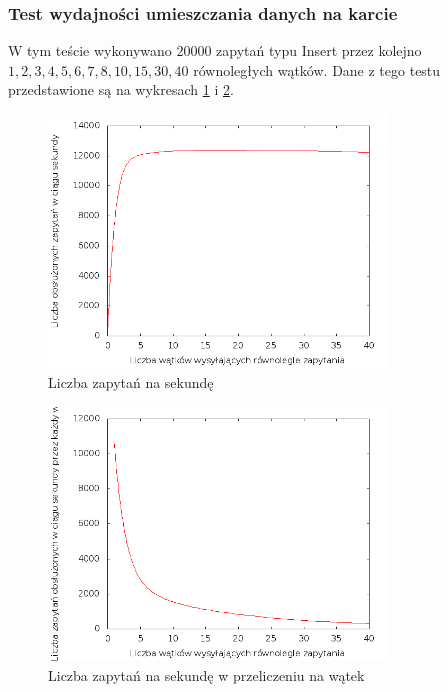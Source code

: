 \documentclass[paper=a4, fontsize=11pt]{scrartcl} %
\numberwithin{equation}{section} %
\numberwithin{figure}{section} %
\numberwithin{table}{section} %
\begin{document}
		\subsubsection{Test wydajności umieszczania danych na karcie}
		W tym teście wykonywano $20000$ zapytań typu Insert przez kolejno $1, 2, 3, 4, 5, 6, 7, 8, 10, 15, 30, 40$ równoległych wątków. Dane z tego testu przedstawione są na wykresach \ref{fig:concurrency} i \ref{fig:concurrencyPerThread}. 
		\begin{figure}[ht!]
	\centering
	\caption{Liczba zapytań na sekundę}
	\label{fig:concurrency}
		\includegraphics[width=0.8\textwidth]{img/concurrencyTest.png}
	\end{figure}
	
	 
		\begin{figure}[ht!]
	\centering
	\caption{Liczba zapytań na sekundę w przeliczeniu na wątek}
		\label{fig:concurrencyPerThread}
		\includegraphics[width=0.8\textwidth]{img/concurrencyTestPerThread.png}
	\end{figure}
	
\end{document}
